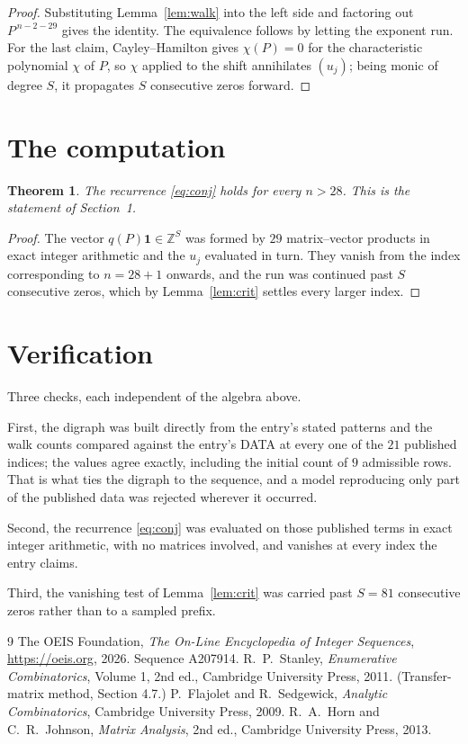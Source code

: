 \documentclass[11pt,a4paper]{article}
\theoremstyle{plain}
\newtheorem{theorem}{Theorem}
\theoremstyle{definition}
\begin{document}
\begin{proof}
Substituting Lemma~\ref{lem:walk} into the left side and factoring out
$P^{\,n-2-29}$ gives the identity. The equivalence follows by letting the exponent
run. For the last claim, Cayley--Hamilton gives $\chi(P)=0$ for the characteristic
polynomial $\chi$ of $P$, so $\chi$ applied to the shift annihilates $(u_j)$; being monic of
degree $S$, it propagates $S$ consecutive zeros forward.
\end{proof}

\section{The computation}

\begin{theorem}
The recurrence \eqref{eq:conj} holds for every $n>28$. This is the statement of
Section~1.
\end{theorem}

\begin{proof}
The vector $q(P)\mathbf{1}\in\mathbb{Z}^{S}$ was formed by $29$ matrix--vector
products in exact integer arithmetic and the $u_j$ evaluated in turn. They vanish from the
index corresponding to $n=28+1$ onwards, and the run was continued past $S$ consecutive
zeros, which by Lemma~\ref{lem:crit} settles every larger index.
\end{proof}

\section{Verification}

Three checks, each independent of the algebra above.

First, the digraph was built directly from the entry's stated patterns and the walk counts
compared against the entry's DATA at every one of the $21$ published indices; the
values agree exactly, including the initial count of $9$ admissible rows. That is
what ties the digraph to the sequence, and a model reproducing only part of the published
data was rejected wherever it occurred.

Second, the recurrence \eqref{eq:conj} was evaluated on those published terms in exact
integer arithmetic, with no matrices involved, and vanishes at every index the entry claims.

Third, the vanishing test of Lemma~\ref{lem:crit} was carried past $S=81$ consecutive
zeros rather than to a sampled prefix.

\begin{thebibliography}{9}
 The OEIS Foundation, \emph{The On-Line Encyclopedia of Integer
Sequences}, \url{https://oeis.org}, 2026. Sequence A207914.
 R.~P.~Stanley, \emph{Enumerative Combinatorics}, Volume 1, 2nd ed.,
Cambridge University Press, 2011. (Transfer-matrix method, Section 4.7.)
 P.~Flajolet and R.~Sedgewick, \emph{Analytic Combinatorics}, Cambridge
University Press, 2009.
 R.~A.~Horn and C.~R.~Johnson, \emph{Matrix Analysis}, 2nd ed., Cambridge
University Press, 2013.
\end{thebibliography}
\end{document}
